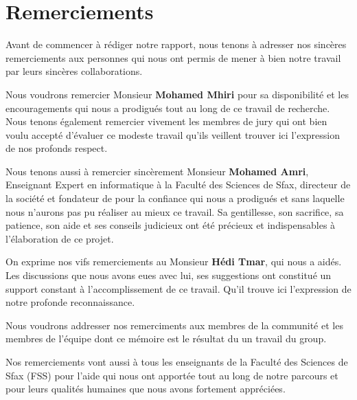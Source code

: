 \section*{Remerciements}

\vspace{0.9in}
\begin{center}

    Avant de commencer à rédiger notre rapport, nous tenons à adresser nos
    sincères remerciements aux personnes qui nous ont permis de mener à bien
    notre travail par leurs sincères collaborations.

    Nous voudrons remercier Monsieur \textbf{Mohamed Mhiri} pour sa
    disponibilité et les encouragements qui nous a prodigués tout au long de ce
    travail de recherche. Nous tenons également remercier vivement les membres
    de jury qui ont bien voulu accepté d'évaluer ce modeste travail qu'ils
    veillent trouver ici l'expression de nos profonds respect.

    Nous tenons aussi à remercier sincèrement Monsieur \textbf{Mohamed Amri},
    Enseignant Expert en informatique à la Faculté des Sciences de Sfax,
    directeur de la société  et fondateur de
     pour la confiance qui nous a prodigués et sans
    laquelle nous n’aurons pas pu réaliser au mieux ce travail. Sa gentillesse,
    son sacrifice, sa patience, son aide et ses conseils judicieux ont été
    précieux et indispensables à l’élaboration de ce projet.

    On exprime nos vifs remerciements au Monsieur \textbf{Hédi Tmar}, qui
    nous a aidés.  Les discussions que nous avons eues avec lui, ses
    suggestions ont constitué un support constant à l’accomplissement de ce
    travail. Qu'il trouve ici l'expression de notre profonde reconnaissance.

    Nous voudrons addresser nos remerciments aux membres de la communité
    \textbf{} et les membres de l'équipe
    \textbf{} dont ce mémoire est le résultat du un
    travail du group.

    Nos remerciements vont aussi à tous les enseignants de la Faculté des
    Sciences de Sfax (FSS) pour l’aide qui nous ont apportée tout au long de
    notre parcours et pour leurs qualités humaines que nous avons fortement
    appréciées.
\end{center}

